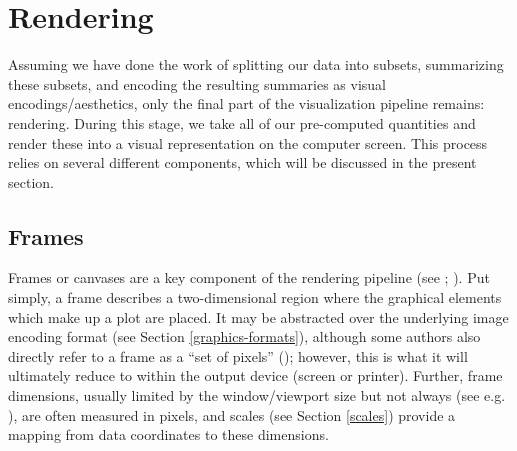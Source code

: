 \documentclass[
  openany]{book}
\theoremstyle{definition}
\theoremstyle{definition}
\theoremstyle{definition}
\theoremstyle{definition}
\theoremstyle{remark}
\begin{document}
\section{Rendering}\label{rendering}

Assuming we have done the work of splitting our data into subsets, summarizing these subsets, and encoding the resulting summaries as visual encodings/aesthetics, only the final part of the visualization pipeline remains: rendering. During this stage, we take all of our pre-computed quantities and render these into a visual representation on the computer screen. This process relies on several different components, which will be discussed in the present section.

\subsection{Frames}\label{frames}

Frames or canvases are a key component of the rendering pipeline (see ; ). Put simply, a frame describes a two-dimensional region where the graphical elements which make up a plot are placed. It may be abstracted over the underlying image encoding format (see Section \ref{graphics-formats}), although some authors also directly refer to a frame as a ``set of pixels'' (); however, this is what it will ultimately reduce to within the output device (screen or printer). Further, frame dimensions, usually limited by the window/viewport size but not always (see e.g. ), are often measured in pixels, and scales (see Section \ref{scales}) provide a mapping from data coordinates to these dimensions.
\end{document}
